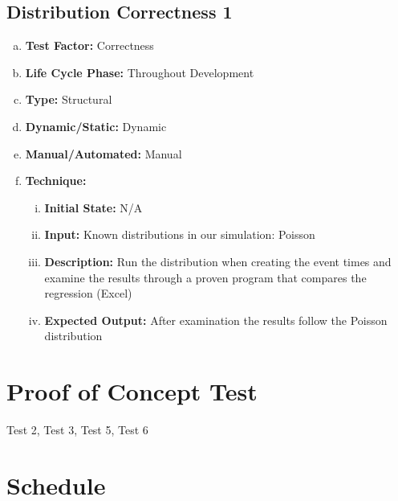 \documentclass[paper=letter, fontsize=10pt]{scrartcl}
\numberwithin{equation}{section}		%
\numberwithin{figure}{section}			%
\numberwithin{table}{section}				%
\begin{document}
\subsection{Distribution Correctness 1}
\begin{enumerate}[(a)]
	\item \textbf{Test Factor:} Correctness 
	\item \textbf{Life Cycle Phase:} Throughout Development
	\item \textbf{Type:} Structural
	\item \textbf{Dynamic/Static:} Dynamic
	\item \textbf{Manual/Automated:} Manual
	\item \textbf{Technique:}
		\begin{enumerate}[(i)]
			\item \textbf{Initial State:} N/A  
			\item \textbf{Input:} Known distributions in our simulation: Poisson
			\item \textbf{Description:} Run the distribution when creating the event times and examine the results through a proven program that compares the regression (Excel)
			\item \textbf{Expected Output:} After examination the results follow the Poisson distribution
		\end{enumerate}
\end{enumerate}

\section{Proof of Concept Test}
	Test 2, Test 3, Test 5, Test 6

\section{Schedule}


\end{document}
